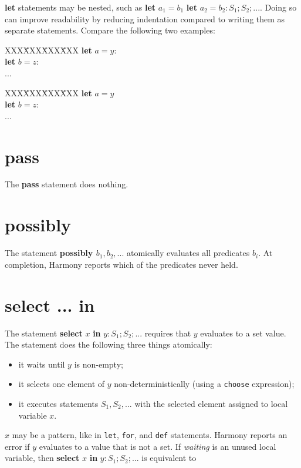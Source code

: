 \documentclass{report}
\newenvironment{code}{
\tcolorbox
}{
\endtcolorbox
}
\begin{document}
\textbf{let} statements may be nested, such as
\textbf{let} $a_1 = b_1$ \textbf{let} $a_2 = b_2: S_1; S_2; ...$.
Doing so can improve readability by reducing indentation
compared to writing them as separate statements.
Compare the following two examples:

\begin{code}
\begin{tabbing}
XXX\=XXX\=XXX\=XXX\kill
\>\textbf{let} $a = y$: \\
\>\>\textbf{let} $b = z$: \\
\>\>\>...
\end{tabbing}
\end{code}
\begin{code}
\begin{tabbing}
XXX\=XXX\=XXX\=XXX\kill
\>\textbf{let} $a = y$ \\
\>\textbf{let} $b = z$: \\
\>\>...
\end{tabbing}
\end{code}

\section{\textbf{pass}}

The \textbf{pass} statement does nothing.

\section{\textbf{possibly}}

The statement \textbf{possibly $b_1, b_2, ...$} atomically evaluates all
predicates $b_i$.
At completion, Harmony reports which of the predicates never held.

\section{\textbf{select ... in}}

The statement \textbf{select} $x$ \textbf{in} $y: S_1; S_2; ...$
requires that $y$ evaluates to a set value.
The statement does the following three things atomically:
\begin{itemize}
\item it waits until $y$ is non-empty;
\item it selects one element of $y$ non-deterministically (using
a \texttt{choose} expression);
\item it executes statements $S_1, S_2, ...$ with the selected element
assigned to local variable $x$.
\end{itemize}
$x$ may be a pattern, like in \texttt{let}, \texttt{for}, and \texttt{def}
statements.
Harmony reports an error if $y$ evaluates to a value that is not a set.
If \textit{waiting} is an unused local variable,
then \textbf{select} $x$ \textbf{in} $y: S_1; S_2; ...$ is equivalent to
\end{document}
